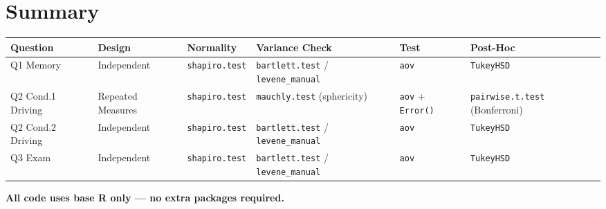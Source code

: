 \documentclass[
]{article}
\begin{document}
\section{Summary}\label{summary}

\begin{longtable}[]{@{}
  >{\raggedright\arraybackslash}p{}
  >{\raggedright\arraybackslash}p{}
  >{\raggedright\arraybackslash}p{}
  >{\raggedright\arraybackslash}p{}
  >{\raggedright\arraybackslash}p{}
  >{\raggedright\arraybackslash}p{}@{}}
\toprule\noalign{}
\begin{minipage}[b]{\linewidth}\raggedright
Question
\end{minipage} & \begin{minipage}[b]{\linewidth}\raggedright
Design
\end{minipage} & \begin{minipage}[b]{\linewidth}\raggedright
Normality
\end{minipage} & \begin{minipage}[b]{\linewidth}\raggedright
Variance Check
\end{minipage} & \begin{minipage}[b]{\linewidth}\raggedright
Test
\end{minipage} & \begin{minipage}[b]{\linewidth}\raggedright
Post-Hoc
\end{minipage} \\
\midrule\noalign{}
\endhead
\bottomrule\noalign{}
\endlastfoot
Q1 Memory & Independent & \texttt{shapiro.test} & \texttt{bartlett.test}
/ \texttt{levene\_manual} & \texttt{aov} & \texttt{TukeyHSD} \\
Q2 Cond.1 Driving & Repeated Measures & \texttt{shapiro.test} &
\texttt{mauchly.test} (sphericity) & \texttt{aov} + \texttt{Error()} &
\texttt{pairwise.t.test} (Bonferroni) \\
Q2 Cond.2 Driving & Independent & \texttt{shapiro.test} &
\texttt{bartlett.test} / \texttt{levene\_manual} & \texttt{aov} &
\texttt{TukeyHSD} \\
Q3 Exam & Independent & \texttt{shapiro.test} & \texttt{bartlett.test} /
\texttt{levene\_manual} & \texttt{aov} & \texttt{TukeyHSD} \\
\end{longtable}

\textbf{All code uses base R only --- no extra packages required.}
\end{document}
